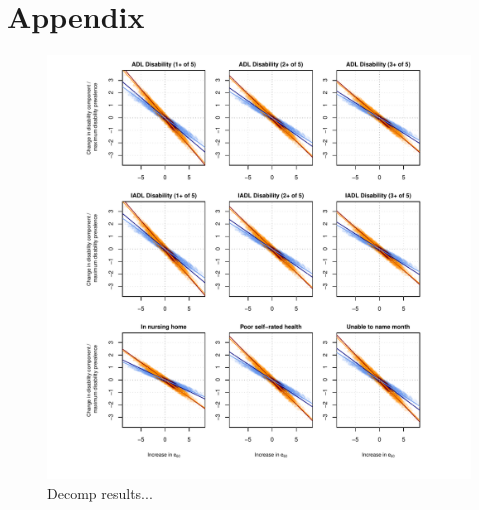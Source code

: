\documentclass[11pt,oneside,a4paper]{article} %
\begin{document}
\section{Appendix}


\begin{figure}
\begin{adjustwidth}{-1.5cm}{}
	\centering
	\includegraphics[scale=.8]{Decomp_3x3_rel.pdf}
	\caption{Decomp results...}
	\label{fig:Fig_Decomp_3x3_rel}
\end{adjustwidth}
\end{figure}



\newpage%


\end{document}
